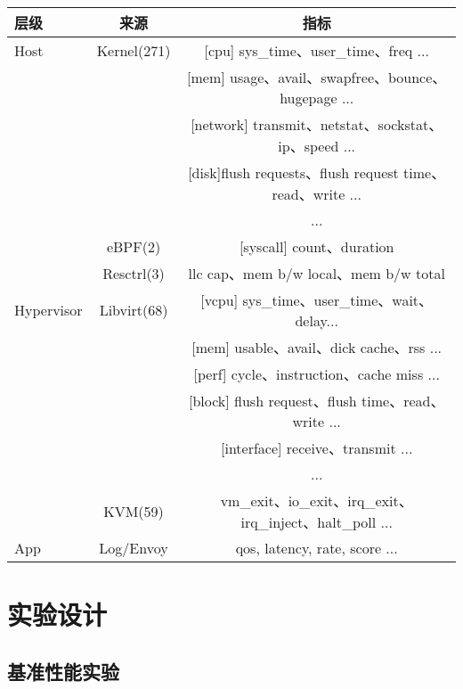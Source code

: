 \begin{table}[H]
    \label{tab:metric_list}
    \footnotesize%
    \setlength{\tabcolsep}{4pt}%
    \renewcommand{\arraystretch}{1.5}%
    \centering
    \begin{tabular}{lcc}
        \hline
        层级 & 来源 & 指标\\
        \hline
        Host & Kernel(271) & [cpu] sys\_time、user\_time、freq ... \\
        & & [mem] usage、avail、swapfree、bounce、hugepage ...\\
        & & [network] transmit、netstat、sockstat、ip、speed ...\\
        & & [disk]flush requests、flush request time、read、write ...\\
        & & ...\\
        & eBPF(2) & [syscall] count、duration\\
        & Resctrl(3) & llc cap、mem b/w local、mem b/w total\\
        Hypervisor & Libvirt(68) & [vcpu] sys\_time、user\_time、wait、delay...\\
        & & [mem] usable、avail、dick cache、rss ...\\
        & & [perf] cycle、instruction、cache miss ...\\
        & & [block] flush request、flush time、read、write ...\\
        & & [interface] receive、transmit ...\\
        & & ...\\
        & KVM(59) & vm\_exit、io\_exit、irq\_exit、irq\_inject、halt\_poll ...\\
        App & Log/Envoy & qos, latency, rate, score ...\\
        \hline
    \end{tabular}
\end{table}

\section{实验设计}

\subsection{基准性能实验}


